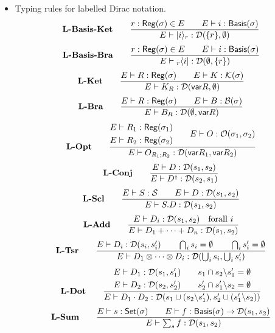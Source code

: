 \begin{itemize}
    \item Typing rules for labelled Dirac notation.
    \[
        \textbf{L-Basis-Ket}\qquad 
        \frac{r : \mathsf{Reg}(\sigma) \in E\qquad E \vdash i : \mathsf{Basis}(\sigma)}{E \vdash |i\rangle_r : \mathcal{D}(\{r\}, \emptyset)}
    \]
    \[
        \textbf{L-Basis-Bra}\qquad 
        \frac{r : \mathsf{Reg}(\sigma) \in E \qquad E \vdash i : \mathsf{Basis}(\sigma)}{E \vdash {}_r\langle i| : \mathcal{D}(\emptyset, \{r\})}
    \]
    \[
        \textbf{L-Ket}\qquad 
        \frac{E \vdash R : \mathsf{Reg}(\sigma)\qquad E \vdash K : \mathcal{K}(\sigma)}{E \vdash K_R : \mathcal{D}(\mathsf{var} R, \emptyset)}
    \]
    \[
        \textbf{L-Bra}\qquad 
        \frac{E \vdash R : \mathsf{Reg}(\sigma)\qquad E \vdash B : \mathcal{B}(\sigma)}{E \vdash B_R : \mathcal{D}(\emptyset, \mathsf{var} R)}
    \]
    \[
        \textbf{L-Opt}\qquad 
        \frac{
            \begin{aligned}
                E \vdash R_1 : \mathsf{Reg} (\sigma_1) \\
                E \vdash R_2 : \mathsf{Reg} (\sigma_2)
            \end{aligned}
            \qquad
            E \vdash O : \mathcal{O}(\sigma_1, \sigma_2)
        }
        {E \vdash O_{R_1;R_2} : \mathcal{D}(\mathsf{var} R_1, \mathsf{var} R_2)}
    \]
    \[
        \textbf{L-Conj}\qquad 
        \frac{E \vdash D : \mathcal{D}(s_1,s_2)}{E \vdash D^\dagger : \mathcal{D}(s_2,s_1)}
    \]
    \[
        \textbf{L-Scl}\qquad 
        \frac{E \vdash S : \mathcal{S}\qquad E \vdash D : \mathcal{D}(s_1,s_2)}{E \vdash S.D : \mathcal{D}(s_1,s_2)}
    \]
    \[
        \textbf{L-Add}\qquad
        \frac{E \vdash D_i : \mathcal{D}(s_1,s_2)\quad \text{forall } i}{E \vdash D_1+\cdots+D_n : \mathcal{D}(s_1,s_2)}
    \]
    \[
        \textbf{L-Tsr}\qquad
        \frac{
            E \vdash D_i : \mathcal{D}(s_i,s_i') \qquad
            \bigcap_i s_i = \emptyset \qquad
            \bigcap_i s_i' = \emptyset
        }
        {E \vdash D_1 \otimes \cdots \otimes D_i : \mathcal{D}(\bigcup_i s_i, \bigcup_i s_i')}
    \]
    \[
        \textbf{L-Dot}\qquad
        \frac{
            \begin{aligned}
                E \vdash D_1 : \mathcal{D}(s_1,s_1') \\
                E \vdash D_2 : \mathcal{D}(s_2,s_2')
            \end{aligned}
            \qquad 
            \begin{aligned}
                s_1 \cap s_2 \backslash s_1' = \emptyset \\
                s_2' \cap s_1' \backslash s_2 = \emptyset
            \end{aligned}
        }
        {E \vdash D_1\cdot D_2 : \mathcal{D}(s_1 \cup (s_2\backslash s_1'), s_2' \cup (s_1'\backslash s_2))}
    \]
    \[
        \textbf{L-Sum}\qquad
        \frac{E \vdash s : \mathsf{Set}(\sigma) \qquad E \vdash f : \mathsf{Basis}(\sigma) \to \mathcal{D}(s_1, s_2)}{E \vdash \sum_{s} f : \mathcal{D}(s_1, s_2)}
    \]

\end{itemize}

